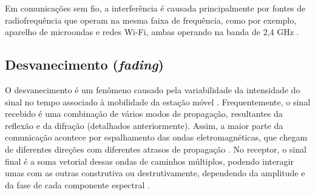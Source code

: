 Em comunicações sem fio, a interferência é causada principalmente por fontes de radiofrequência que operam na mesma faixa de frequência, como por exemplo, aparelho de microondas e redes Wi-Fi, ambas operando na banda de 2,4 GHz \cite{moraes2010}.

\begin{figure}[H]
	\centering
\end{figure}

\subsection{Desvanecimento (\textit{fading})}
\label{sub:desvanecimento}

O desvanecimento é um fenômeno causado pela variabilidade da intensidade do sinal no tempo associado à mobilidade da estação móvel \cite{haykin2009,rappaport2009}. Frequentemente, o sinal recebido é uma combinação de vários modos de propagação, resultantes da reflexão e da difração (detalhados anteriormente). Assim, a maior parte da comunicação acontece por espalhamento das ondas eletromagnéticas, que chegam de diferentes direções com diferentes atrasos de propagação \cite{haykin2009}. No receptor, o sinal final é a soma vetorial dessas ondas de caminhos múltiplos, podendo interagir umas com as outras construtiva ou destrutivamente, dependendo da amplitude e da fase de cada componente espectral \cite{haykin2009}.

\begin{figure}[H]
	\centering
\end{figure}

